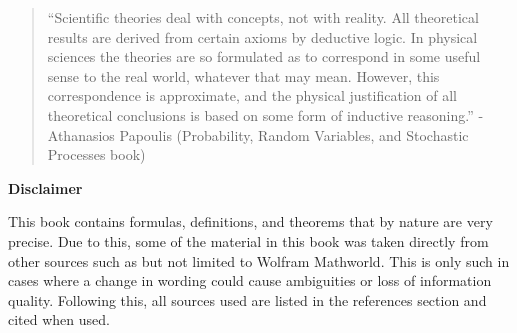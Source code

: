 \begin{quotation}
``Scientific theories deal with concepts, not with reality. All theoretical results are derived from certain axioms by deductive logic. In physical sciences the theories are so formulated as to correspond in some useful sense to the real world, whatever that may mean. However, this correspondence is approximate, and the physical justification of all theoretical conclusions is based on some form of inductive reasoning.'' - Athanasios Papoulis (Probability, Random Variables, and Stochastic Processes book)
\end{quotation}

\begin{center}
	\textbf{Disclaimer}
\end{center}

This book contains formulas, definitions, and theorems that by nature are very precise. Due to this, some of the material in this book was taken directly from other sources such as but not limited to Wolfram Mathworld. This is only such in cases where a change in wording could cause ambiguities or loss of information quality.  Following this, all sources used are listed in the references section and cited when used.

